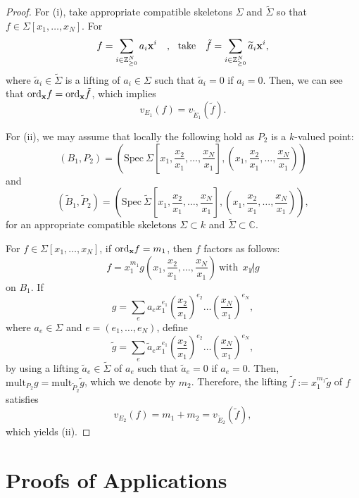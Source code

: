 \documentclass[a4paper]{amsart}
\def\CC{{\mathbb{C}}}
\def\ZZ{{\mathbb{Z}}}
\newcommand{\oo}{{\mathcal O}}
\newcommand{\ord}{{\mathrm{ord}}}
\newcommand{\mult}{{\mathrm{mult}}}
\newcommand{\spec}{{\mathrm{Spec \ }}}
\newcommand{\tf}{{\tilde f}}
\newcommand{\we}{{\widetilde E}}
\newcommand{\wB}{{\widetilde{B}}}
\newcommand{\tg}{{\tilde g}}
\newcommand{\ta}{{\widetilde{a}}}
\newcommand{\wsig}{{\widetilde{\Sigma}}}
\newcommand{\tP}{{\widetilde{P}}}
\newcommand{\wv}{{\widetilde{\varphi}}}
\renewcommand{\L}{{\mathcal{L}}}
\newcommand{\wL}{{\widetilde{\L}}}
\theoremstyle{definition}
\begin{document}
\begin{proof} For (i), take appropriate compatible skeletons $\Sigma$ and $\wsig$ so that $f\in \Sigma[x_1,\ldots, x_N]$.
For  $$f=\sum_{i\in \ZZ^N_{\geq 0}} a_i{\bold{x}}^i\ \ \  ,\ \ \mbox{take}\ \ \ \tf=\sum_{i\in \ZZ^N_{\geq 0}} \ta_i\bold{x}^i,$$
where $\ta_i\in \wsig$ is a lifting of $a_i\in \Sigma$ such that 
 $\ta_i=0$ if $ a_i=0$. 
Then, we can see that $\ord_{\bold x} f=\ord_{\bold x} \tf$, which implies 
$$v_{E_1}(f)=v_{\we_1}(\tf).$$

For (ii),  we may  assume that locally the following hold as $P_2$ is a $k$-valued point:
$$(B_{1}, P_{2})=\left(\spec \Sigma \left[x_1,\frac{x_2}{x_1},\ldots, \frac{x_N}{x_1}\right], \left(x_1,\frac{x_2}{x_1},\ldots, \frac{x_N}{x_1}\right)\right)$$
and
  $$(\wB_{1}, \tP_{2})=\left(\spec \wsig \left[x_1,\frac{x_2}{x_1},\ldots, \frac{x_N}{x_1}\right], \left(x_1,\frac{x_2}{x_1},\ldots, \frac{x_N}{x_1}\right)\right),$$
  for an appropriate compatible skeletons $\Sigma\subset k$ and $\wsig\subset\CC$.
 
  For $f\in \Sigma[x_1,\ldots, x_N]$, 
    if $\ord_{\bold x}f=m_1$, then $f$ factors as  follows:
  $$f=x_1^{m_1} g \left(x_1,\frac{x_2}{x_1},\ldots, \frac{x_N}{x_1}\right)\ \mbox{with}\ \  x_1\not| g$$
  on $B_{1}$.
  If $$g=\sum_e a_e x_1^{e_1}\left( \frac{x_2}{x_1}\right)^{e_2}\ldots  \left(\frac{x_N}{x_1}\right)^{e_N},$$  where  $a_e\in \Sigma$
  and $e=(e_1,\ldots, e_N)$,
  define $$\tg =\sum_e \ta_e x_1^{e_1}\left( \frac{x_2}{x_1}\right)^{e_2}\ldots  \left(\frac{x_N}{x_1}\right)^{e_N},$$
  by using a lifting $\ta_e\in \wsig$ of $a_e$ 
  such that $\ta_e=0$ if $a_e=0$.
  Then, $\mult_{P_{2}}g=\mult_{\tP_{2}}\tg$, which we denote by $m_2$.
  Therefore, the lifting
 $\tf:=x_1^{m_1}\tg$ of $f$ satisfies
  $$v_{E_{2}}(f)=m_1+m_2=v_{\we_{2}}(\tf),$$
  which yields (ii).
  
\end{proof}  

    
  
    

    
    
      

\section{Proofs of Applications}




\end{document}
